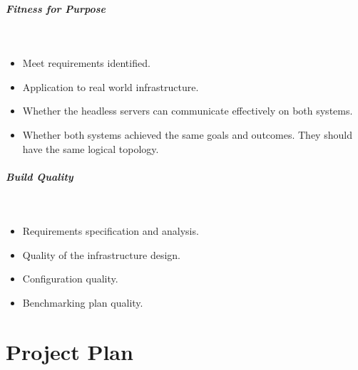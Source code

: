 \subparagraph{Fitness for Purpose}~
\begin{itemize}
	\item Meet requirements identified.
	\item Application to real world infrastructure.
	\item Whether the headless servers can communicate effectively on both systems.
	\item Whether both systems achieved the same goals and outcomes. They should have the same logical topology.
\end{itemize}

\subparagraph{Build Quality}~
\begin{itemize}
	\item Requirements specification and analysis.
	\item Quality of the infrastructure design.
	\item Configuration quality.
	\item Benchmarking plan quality.
\end{itemize}

\clearpage

\section{Project Plan}
\noindent
{}
